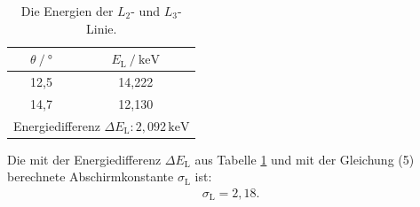 \begin{table}[H]
  \centering
  \caption{Die Energien der $L_2$- und $L_3$-Linie.}
  \label{tab:hg}
\begin{tabular}{c c}
  \toprule
$\theta\:/\:°$ & $E_\text{L}\:/\: \si{\kilo\electronvolt}$ \\
\midrule
12,5 & 14,222 \\
14,7 & 12,130 \\
\midrule
\multicolumn{2}{c}{Energiedifferenz $\Delta E_\text{L}: 2,092\,\si{\kilo\electronvolt}$} \\
\bottomrule
\end{tabular}
\end{table}
\noindent Die mit der Energiedifferenz $\Delta E_\text{L}$ aus Tabelle \ref{tab:hg} und mit der Gleichung (5) berechnete Abschirmkonstante $\sigma_\text{L}$ ist:
\begin{align*}
\sigma_\text{L} = 2,18.
\end{align*}
